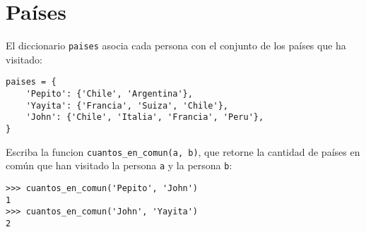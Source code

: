 \section{Países}

El diccionario \lstinline!paises! asocia cada persona con el conjunto de
los países que ha visitado:
\begin{lstlisting}
paises = {
    'Pepito': {'Chile', 'Argentina'},
    'Yayita': {'Francia', 'Suiza', 'Chile'},
    'John': {'Chile', 'Italia', 'Francia', 'Peru'},
}
\end{lstlisting}

Escriba la funcion \lstinline!cuantos_en_comun(a, b)!,
que retorne la cantidad de países en común
que han visitado la persona \lstinline!a! y la persona \lstinline!b!:
\begin{lstlisting}
>>> cuantos_en_comun('Pepito', 'John')
1
>>> cuantos_en_comun('John', 'Yayita')
2
\end{lstlisting}

